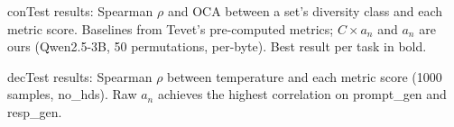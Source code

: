 

\begin{table}[t]
\centering
\caption{conTest results: Spearman $\rho$ and OCA between a set's diversity class and each metric score.
Baselines from Tevet's pre-computed metrics; $C \!\times\! a_n$ and $a_n$ are ours (Qwen2.5-3B, 50 permutations, per-byte).
Best result per task in bold.}
\label{tab:contest}
\small

\end{table}

\begin{table}[t]
\centering
\caption{decTest results: Spearman $\rho$ between temperature and each metric score (1000 samples, no\_hds).
Raw $a_n$ achieves the highest correlation on prompt\_gen and resp\_gen.}
\label{tab:dectest}
\small

\end{table}

